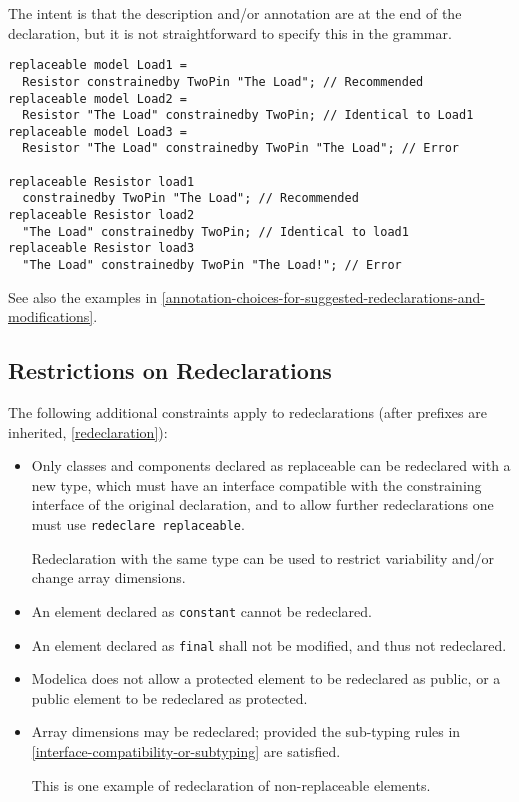 \begin{nonnormative}
The intent is that the description and/or annotation are at the end of the declaration, but it is not straightforward to specify this in the grammar.
\end{nonnormative}

\begin{example}
\begin{lstlisting}[language=modelica]
replaceable model Load1 =
  Resistor constrainedby TwoPin "The Load"; // Recommended
replaceable model Load2 =
  Resistor "The Load" constrainedby TwoPin; // Identical to Load1
replaceable model Load3 =
  Resistor "The Load" constrainedby TwoPin "The Load"; // Error

replaceable Resistor load1
  constrainedby TwoPin "The Load"; // Recommended
replaceable Resistor load2
  "The Load" constrainedby TwoPin; // Identical to load1
replaceable Resistor load3
  "The Load" constrainedby TwoPin "The Load!"; // Error
\end{lstlisting}
\end{example}

See also the examples in \cref{annotation-choices-for-suggested-redeclarations-and-modifications}.

\subsection{Restrictions on Redeclarations}\label{restrictions-on-redeclarations}

The following additional constraints apply to redeclarations (after
prefixes are inherited, \cref{redeclaration}):
\begin{itemize}
\item
  Only classes and components declared as replaceable can be redeclared with a new type, which must have an interface compatible with the constraining
  interface of the original declaration, and to allow further redeclarations one must use \lstinline!redeclare replaceable!.
  \begin{nonnormative}
  Redeclaration with the same type can be used to restrict variability and/or change array dimensions.
  \end{nonnormative}
\item
  An element declared as \lstinline!constant! cannot be redeclared.
\item
  An element declared as \lstinline!final! shall not be modified, and thus not redeclared.
\item
  Modelica does not allow a protected element to be redeclared as public, or a public element to be redeclared as protected.
\item
  Array dimensions may be redeclared; provided the sub-typing rules in \cref{interface-compatibility-or-subtyping} are satisfied.
  \begin{nonnormative}
  This is one example of redeclaration of non-replaceable elements.
  \end{nonnormative}
\end{itemize}


